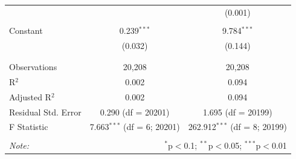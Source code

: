 \begin{table}[!htbp]
\begin{tabular}{@{\extracolsep{5pt}}lcc}
  &  & (0.001) \\ 
  & & \\ 
 Constant & 0.239$^{***}$ & 9.784$^{***}$ \\ 
  & (0.032) & (0.144) \\ 
  & & \\ 
\hline \\[-1.8ex] 
Observations & 20,208 & 20,208 \\ 
R$^{2}$ & 0.002 & 0.094 \\ 
Adjusted R$^{2}$ & 0.002 & 0.094 \\ 
Residual Std. Error & 0.290 (df = 20201) & 1.695 (df = 20199) \\ 
F Statistic & 7.663$^{***}$ (df = 6; 20201) & 262.912$^{***}$ (df = 8; 20199) \\ 
\hline 
\hline \\[-1.8ex] 
\textit{Note:}  & \multicolumn{2}{r}{$^{*}$p$<$0.1; $^{**}$p$<$0.05; $^{***}$p$<$0.01} \\ 
\end{tabular} 
\end{table} 
